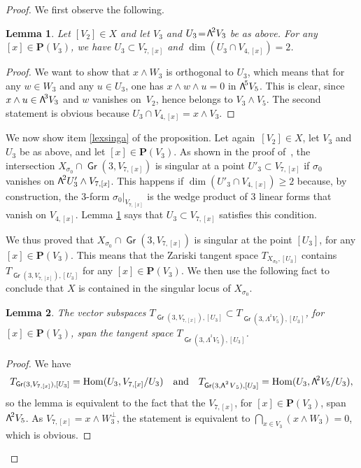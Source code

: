 \documentclass[11pt]{article}
\newtheorem{lemm}{Lemma}[section]
\theoremstyle{definition}
\renewcommand\P{{\mathbf P}}\let\PP\P
\DeclareMathOperator{\Gr}{\mathsf{Gr}}
\DeclareMathOperator{\Hom}{Hom}
\newcommand\bw[1]{{\hbox{\large$\mathsf{\Lambda}$}^{\!#1}}}
\newcommand\sbw[2]{{{\mathsf{\Lambda}}^{^{\scriptscriptstyle#1}}{#2}}}
\begin{document}
\pagebreak[2]
\begin{proof}
We first observe the following.

\begin{lemm}
\label{sublepourg6}
Let $[V_2]\!\in\!X$
and let $V_3$ and $U_3\!=\!\bw2V_3$ be as above. For any $[x]\!\in\!\P(V_3)$, we have $U_3\subset V_{7,[x]}$ and $\dim (U_3\cap V_{4,[x]})=2$.
\end{lemm}

\begin{proof} We want to show that $x\wedge W_3$ is orthogonal to
$U_3$, which means that
for any $w\in W_3$ and any $u\in U_3$, one has $x\wedge w\wedge u=0$ in $\bw5V_5$. This is clear, since
$x\wedge u\in \bw3V_3$ and $w$ vanishes on~$V_2$, hence belongs to $V_3\wedge V_5$.
The second statement is obvious because $U_3\cap V_{4,[x]}=x\wedge V_3$.
\end{proof}

We now show item \eqref{lexsinga} of the proposition. Let again~\mbox{$[V_2]\in X$,} let $V_3$ and $U_3$ be as above, and let $[x]\in \P(V_3)$. As shown in the proof of~\cite[Prop.\,3.1]{devo}, the intersection $X_{\sigma_0}\cap \Gr(3,V_{7,[x]})$ is singular at a point $U'_3\subset V_{7,[x]}$ if $\sigma_0$ vanishes on $\bw2U'_3\wedge V_{7,[x]}$. This happens if $\dim(U'_3\cap V_{4,[x]})\ge2$ because, by construction, the $3$-form $\sigma_0\vert_{ V_{7,[x]}}$ is the wedge product of 3 linear forms that vanish on $V_{4,[x]}$.
Lemma \ref{sublepourg6} says that $U_3\subset V_{7,[x]}$ satisfies this condition.

We thus proved that
$X_{\sigma_0}\cap \Gr(3,V_{7,[x]})$ is singular at the point $[U_3]$, for any $[x]\in \P(V_3)$.
This means that the Zariski tangent space $T_{X_{\sigma_0},[U_3]}$ contains $T_{\Gr(3,V_{7,[x]}),[U_3]}$ for any $[x]\in \P(V_3)$. We then use the following fact to conclude that $X$ is contained in the singular locus of $X_{\sigma_0}$.

\begin{lemm}\label{lepourpropsingx}
The vector subspaces $T_{\Gr(3,V_{7,[x]}),[U_3]}\subset
T_{\Gr(3,\sbw2V_5),[U_3]}$, for $[x]\in \P(V_3)$, span the tangent space $T_{\Gr(3,\sbw2V_5),[U_3]}$.
\end{lemm}

\begin{proof} We have
\[
T_{\Gr(3,V_{7,[x]}),[U_3]}=\Hom (U_3,V_{7,[x]}/U_3)\quad\text{and}\quad T_{\Gr(3,\sbw2V_5),[U_3]}=\Hom (U_3,\bw2V_5/U_3),
\]
so the lemma is equivalent to the fact that the $V_{7,[x]}$, for $[x]\in \P(V_3)$, span $\bw2V_5$. As
$V_{7,[x]}=x\wedge W_3^{\perp}$, the statement is equivalent to
$\bigcap_{x\in V_3}(x\wedge W_3)=0$, which is obvious.
\end{proof}


\end{proof}
\end{document}

